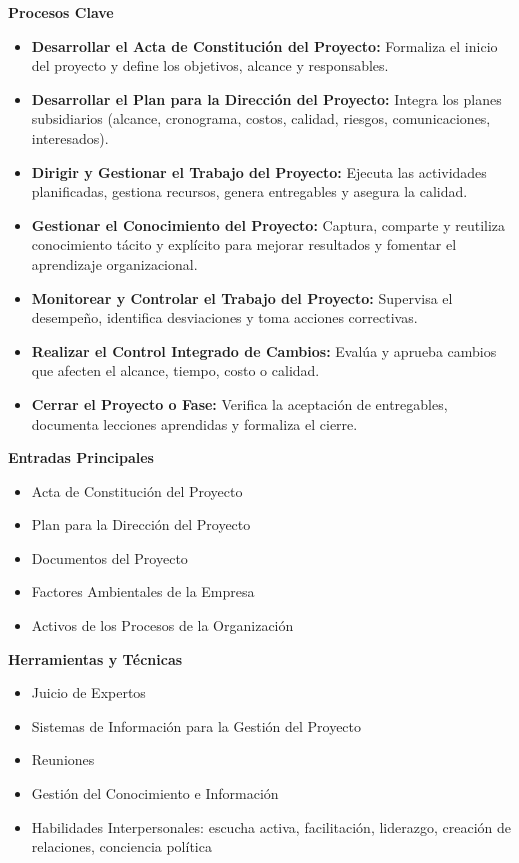       \textbf{Procesos Clave}
      \begin{itemize}
          \item \textbf{Desarrollar el Acta de Constitución del Proyecto:} Formaliza el inicio del proyecto y define los objetivos, alcance y responsables.
          \item \textbf{Desarrollar el Plan para la Dirección del Proyecto:} Integra los planes subsidiarios (alcance, cronograma, costos, calidad, riesgos, comunicaciones, interesados).
          \item \textbf{Dirigir y Gestionar el Trabajo del Proyecto:} Ejecuta las actividades planificadas, gestiona recursos, genera entregables y asegura la calidad.
          \item \textbf{Gestionar el Conocimiento del Proyecto:} Captura, comparte y reutiliza conocimiento tácito y explícito para mejorar resultados y fomentar el aprendizaje organizacional.
          \item \textbf{Monitorear y Controlar el Trabajo del Proyecto:} Supervisa el desempeño, identifica desviaciones y toma acciones correctivas.
          \item \textbf{Realizar el Control Integrado de Cambios:} Evalúa y aprueba cambios que afecten el alcance, tiempo, costo o calidad.
          \item \textbf{Cerrar el Proyecto o Fase:} Verifica la aceptación de entregables, documenta lecciones aprendidas y formaliza el cierre.
      \end{itemize}

      \textbf{Entradas Principales}
      \begin{itemize}
          \item Acta de Constitución del Proyecto
          \item Plan para la Dirección del Proyecto
          \item Documentos del Proyecto
          \item Factores Ambientales de la Empresa
          \item Activos de los Procesos de la Organización
      \end{itemize}

      \textbf{Herramientas y Técnicas}
      \begin{itemize}
          \item Juicio de Expertos
          \item Sistemas de Información para la Gestión del Proyecto
          \item Reuniones
          \item Gestión del Conocimiento e Información
          \item Habilidades Interpersonales: escucha activa, facilitación, liderazgo, creación de relaciones, conciencia política
      \end{itemize}

